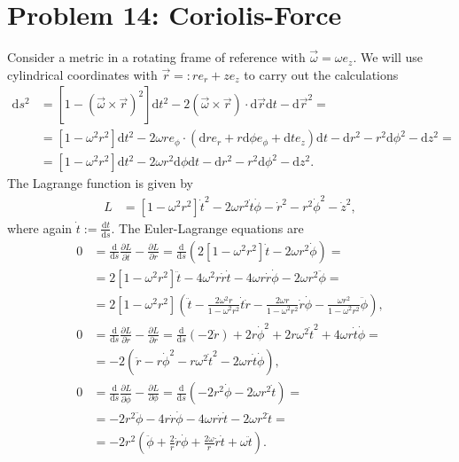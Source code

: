 \documentclass[english, parskip=full]{scrartcl}
\newcommand{\kla}{}
\newcommand{\klam}{}
\newcommand{\tecxt}{}
\begin{document}
\section*{Problem 14: Coriolis-Force}
Consider a metric in a rotating frame of reference with $\vec{\omega} = \omega e_z$.
We will use cylindrical coordinates with $\vec{r} =: re_r + ze_z$ to carry out the calculations
\begin{align}
\tecxt\text{d}s^2 &= \klam\left[ 1 - (\vec{\omega} \times \vec{r})^2 \right] \tecxt\text{d}t^2 - 2 (\vec{\omega} \times \vec{r}) \cdot \tecxt\text{d}\vec{r} \tecxt\text{d}t - \tecxt\text{d}\vec{r}^2 = \\
&= \klam\left[ 1 - \omega^2r^2 \right] \tecxt\text{d}t^2 - 2\omega re_\phi \cdot \kla\left( \tecxt\text{d}r e_r + r\tecxt\text{d}\phi e_\phi + \tecxt\text{d}t e_z \right) \tecxt\text{d}t - \tecxt\text{d}r^2 - r^2\tecxt\text{d}\phi^2 - \tecxt\text{d}z^2 = \\
&= \klam\left[ 1 - \omega^2r^2 \right]\tecxt\text{d}t^2 - 2\omega r^2\tecxt\text{d} \phi\tecxt\text{d}t - \tecxt\text{d}r^2 - r^2\tecxt\text{d}\phi^2 - \tecxt\text{d}z^2.
\end{align}
The Lagrange function is given by 
\begin{align}
L &= \klam\left[ 1 - \omega^2r^2 \right] \dot{t}^2 - 2\omega r^2 \dot{t}\dot{\phi} - \dot{r}^2 - r^2\dot{\phi}^2 - \dot{z}^2,
\end{align}
where again $\dot{t} := \frac{\tecxt\text{d}t}{\tecxt\text{d}s}$.
The Euler-Lagrange equations are
\begin{align}
0 &= \frac{\tecxt\text{d}}{\tecxt\text{d}s} \frac{\partial L}{\partial \dot{t}} - \frac{\partial L}{\partial r} = \frac{\tecxt\text{d}}{\tecxt\text{d}s} \kla\left( 2\klam\left[ 1 - \omega^2r^2 \right] \dot{t} - 2\omega r^2 \dot{\phi} \right) = \\
&= 2\klam\left[ 1 - \omega^2r^2 \right] \ddot{t} - 4\omega^2 r\dot{r}\dot{t} -4\omega r\dot{r}\dot{\phi} - 2\omega r^2 \ddot{\phi} = \\
&= 2\klam\left[ 1 - \omega^2r^2 \right] \kla\left( \ddot{t} - \frac{2\omega^2 r}{1 - \omega^2r^2} \dot{t}\dot{r} - \frac{2\omega r}{1 - \omega^2r^2 } \dot{r}\dot{\phi} - \frac{\omega r^2}{1 - \omega^2r^2 } \ddot{\phi} \right),\\
0 &= \frac{\tecxt\text{d}}{\tecxt\text{d}s} \frac{\partial L}{\partial \dot{r}} - \frac{\partial L}{\partial r} = \frac{\tecxt\text{d}}{\tecxt\text{d}s} (-2\dot{r}) + 2r\dot{\phi}^2 + 2r\omega^2\dot{t}^2 + 4\omega r \dot{t}\dot{\phi} = \\
&= -2\kla\left( \ddot{r} - r\dot{\phi}^2 - r\omega^2\dot{t}^2 - 2\omega r\dot{t}\dot{\phi} \right) ,\\
0 &= \frac{\tecxt\text{d}}{\tecxt\text{d}s} \frac{\partial L}{\partial \dot{\phi}} - \frac{\partial L}{\partial \phi} = \frac{\tecxt\text{d}}{\tecxt\text{d}s} \kla\left( -2r^2\dot{\phi} - 2\omega r^2 \dot{t} \right) = \\
&= -2r^2\ddot{\phi} - 4r\dot{r}\dot{\phi} - 4\omega r\dot{r}\dot{t} - 2\omega r^2\ddot{t} = \\
&= -2r^2 \kla\left( \ddot{\phi} + \frac{2}{r} \dot{r} \dot{\phi} + \frac{2\omega }{r} \dot{r}\dot{t} + \omega\ddot{t}  \right).
\end{align}
\end{document}
